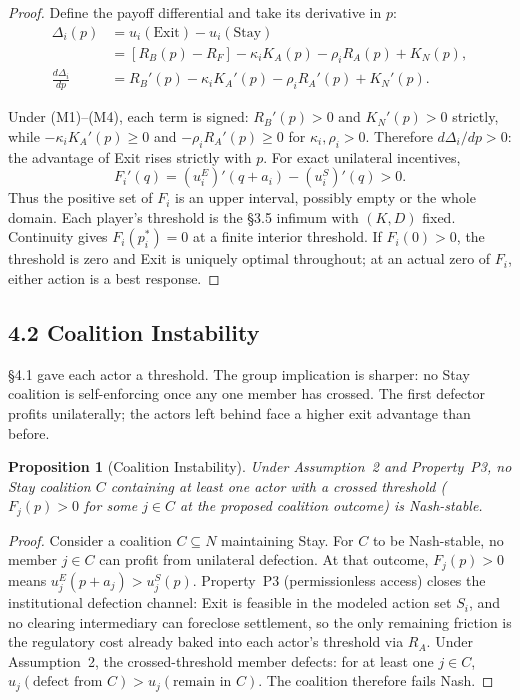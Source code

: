 \documentclass[12pt]{article}
\newtheorem{proposition}{Proposition}
\theoremstyle{definition}
\theoremstyle{remark}
\begin{document}
\begin{proof}
Define the payoff differential and take its derivative in $p$:
\begin{align*}
\Delta_i(p) &= u_i(\text{Exit}) - u_i(\text{Stay}) \\
            &= [R_B(p) - R_F] - \kappa_i K_A(p) - \rho_i R_A(p) + K_N(p), \\
\frac{d\Delta_i}{dp} &= R_B'(p) - \kappa_i K_A'(p) - \rho_i R_A'(p) + K_N'(p).
\end{align*}

Under (M1)--(M4), each term is signed: $R_B'(p) > 0$ and $K_N'(p) > 0$ strictly, while $-\kappa_i K_A'(p) \geq 0$ and $-\rho_i R_A'(p) \geq 0$ for $\kappa_i, \rho_i > 0$. Therefore $d\Delta_i/dp > 0$: the advantage of Exit rises strictly with $p$. For exact unilateral incentives,
\[
 F_i'(q)=(u_i^E)'(q+a_i)-(u_i^S)'(q)>0.
\]
Thus the positive set of $F_i$ is an upper interval, possibly empty or the whole domain. Each player's threshold is the \S3.5 infimum with $(K,D)$ fixed. Continuity gives $F_i(p_i^*)=0$ at a finite interior threshold. If $F_i(0)>0$, the threshold is zero and Exit is uniquely optimal throughout; at an actual zero of $F_i$, either action is a best response.

\end{proof}

\subsection{4.2 Coalition Instability}

\S4.1 gave each actor a threshold. The group implication is sharper: no Stay coalition is self-enforcing once any one member has crossed. The first defector profits unilaterally; the actors left behind face a higher exit advantage than before.

\begin{proposition}[Coalition Instability]
Under Assumption~2 and Property~P3, no Stay coalition $C$
containing at least one actor with a crossed threshold
($F_j(p)>0$ for some $j\in C$ at the proposed coalition outcome) is Nash-stable.
\end{proposition}

\begin{proof}
Consider a coalition $C \subseteq N$ maintaining Stay. For $C$ to be Nash-stable, no member $j \in C$ can profit from unilateral defection. At that outcome, $F_j(p)>0$ means $u_j^E(p+a_j)>u_j^S(p)$. Property~P3 (permissionless access) closes the institutional defection channel: Exit is feasible in the modeled action set $S_i$, and no clearing intermediary can foreclose settlement, so the only remaining friction is the regulatory cost already baked into each actor's threshold via $R_A$. Under Assumption~2, the crossed-threshold member defects: for at least one $j \in C$, $u_j(\text{defect from } C) > u_j(\text{remain in } C)$. The coalition therefore fails Nash.
\end{proof}
\end{document}
